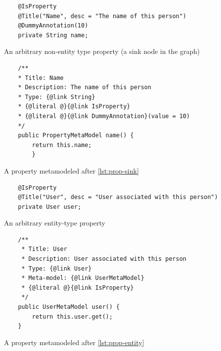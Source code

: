 \begin{listing}[H]
    \begin{verbatim}
    @IsProperty
    @Title("Name", desc = "The name of this person")
    @DummyAnnotation(10)
    private String name;
    \end{verbatim}
    \caption{An arbitrary non-entity type property (a sink node in the graph)}
    \label{lst:prop-sink}
\end{listing}

\begin{listing}[H]
    \begin{verbatim}
    /**
    * Title: Name
    * Description: The name of this person
    * Type: {@link String}
    * {@literal @}{@link IsProperty}
    * {@literal @}{@link DummyAnnotation}(value = 10)
    */
    public PropertyMetaModel name() {
        return this.name;
        }
    \end{verbatim}
    \caption{A property metamodeled after \ref{lst:prop-sink}}
    \label{lst:meta-prop-sink}
\end{listing}

\begin{listing}[H]
    \begin{verbatim}
    @IsProperty
    @Title("User", desc = "User associated with this person")
    private User user;
    \end{verbatim}
    \caption{An arbitrary entity-type property}
    \label{lst:prop-entity}
\end{listing}

\begin{listing}[H]
    \begin{verbatim}
    /**
     * Title: User
     * Description: User associated with this person
     * Type: {@link User}
     * Meta-model: {@link UserMetaModel}
     * {@literal @}{@link IsProperty}
     */
    public UserMetaModel user() {
        return this.user.get();
    }
    \end{verbatim}
    \caption{A property metamodeled after \ref{lst:prop-entity}}
    \label{lst:meta-prop-entity}
\end{listing}



